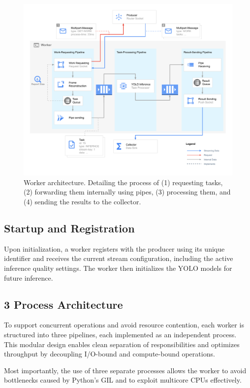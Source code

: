\begin{figure}[htbp]
    \centering
    \includegraphics[width=\textwidth]{img/implementation/implementation_worker_architecture.drawio.pdf}
    \caption{Worker architecture. Detailing the process of (1) requesting tasks, (2) forwarding them internally using pipes,  (3) processing them, and (4) sending the results to the collector.}
    \label{fig:implementation-worker-architecture}
\end{figure}

\subsection{Startup and Registration}
Upon initialization, a worker registers with the producer using its unique identifier and receives the current stream configuration, including the active inference quality settings. The worker then initializes the YOLO models for future inference.

\subsection{3 Process Architecture}
To support concurrent operations and avoid resource contention, each worker is structured into three pipelines, each implemented as an independent process. This modular design enables clean separation of responsibilities and optimizes throughput by decoupling I/O-bound and compute-bound operations.

Most importantly, the use of three separate processes allows the worker to avoid bottlenecks caused by Python’s GIL and to exploit multicore CPUs effectively.

